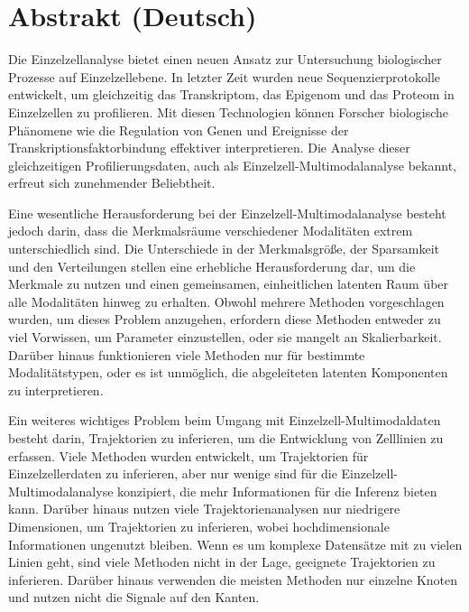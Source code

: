 \chapter*{Abstrakt (Deutsch)}

Die Einzelzellanalyse bietet einen neuen Ansatz zur Untersuchung biologischer Prozesse auf Einzelzellebene. In letzter Zeit wurden neue Sequenzierprotokolle entwickelt, um gleichzeitig das Transkriptom, das Epigenom und das Proteom in Einzelzellen zu profilieren. Mit diesen Technologien können Forscher biologische Phänomene wie die Regulation von Genen und Ereignisse der Transkriptionsfaktorbindung effektiver interpretieren. Die Analyse dieser gleichzeitigen Profilierungsdaten, auch als Einzelzell-Multimodalanalyse bekannt, erfreut sich zunehmender Beliebtheit.

Eine wesentliche Herausforderung bei der Einzelzell-Multimodalanalyse besteht jedoch darin, dass die Merkmalsräume verschiedener Modalitäten extrem unterschiedlich sind. Die Unterschiede in der Merkmalsgröße, der Sparsamkeit und den Verteilungen stellen eine erhebliche Herausforderung dar, um die Merkmale zu nutzen und einen gemeinsamen, einheitlichen latenten Raum über alle Modalitäten hinweg zu erhalten. Obwohl mehrere Methoden vorgeschlagen wurden, um dieses Problem anzugehen, erfordern diese Methoden entweder zu viel Vorwissen, um Parameter einzustellen, oder sie mangelt an Skalierbarkeit. Darüber hinaus funktionieren viele Methoden nur für bestimmte Modalitätstypen, oder es ist unmöglich, die abgeleiteten latenten Komponenten zu interpretieren.

Ein weiteres wichtiges Problem beim Umgang mit Einzelzell-Multimodaldaten besteht darin, Trajektorien zu inferieren, um die Entwicklung von Zelllinien zu erfassen. Viele Methoden wurden entwickelt, um Trajektorien für Einzelzellerdaten zu inferieren, aber nur wenige sind für die Einzelzell-Multimodalanalyse konzipiert, die mehr Informationen für die Inferenz bieten kann. Darüber hinaus nutzen viele Trajektorienanalysen nur niedrigere Dimensionen, um Trajektorien zu inferieren, wobei hochdimensionale Informationen ungenutzt bleiben. Wenn es um komplexe Datensätze mit zu vielen Linien geht, sind viele Methoden nicht in der Lage, geeignete Trajektorien zu inferieren. Darüber hinaus verwenden die meisten Methoden nur einzelne Knoten und nutzen nicht die Signale auf den Kanten.

